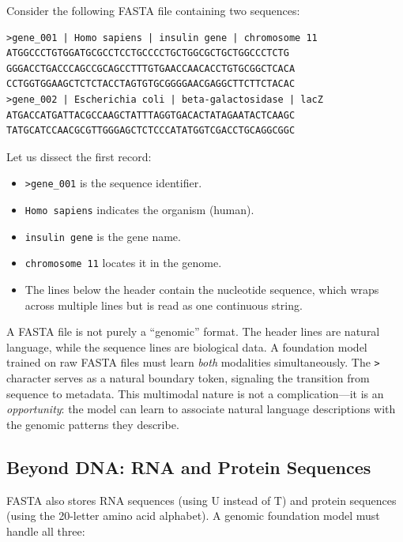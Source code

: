 \begin{example}
Consider the following FASTA file containing two sequences:

\begin{verbatim}
>gene_001 | Homo sapiens | insulin gene | chromosome 11
ATGGCCCTGTGGATGCGCCTCCTGCCCCTGCTGGCGCTGCTGGCCCTCTG
GGGACCTGACCCAGCCGCAGCCTTTGTGAACCAACACCTGTGCGGCTCACA
CCTGGTGGAAGCTCTCTACCTAGTGTGCGGGGAACGAGGCTTCTTCTACAC
>gene_002 | Escherichia coli | beta-galactosidase | lacZ
ATGACCATGATTACGCCAAGCTATTTAGGTGACACTATAGAATACTCAAGC
TATGCATCCAACGCGTTGGGAGCTCTCCCATATGGTCGACCTGCAGGCGGC
\end{verbatim}

\noindent
Let us dissect the first record:
\begin{itemize}[leftmargin=1.5em]
  \item \texttt{>gene\_001} is the sequence identifier.
  \item \texttt{Homo sapiens} indicates the organism (human).
  \item \texttt{insulin gene} is the gene name.
  \item \texttt{chromosome 11} locates it in the genome.
  \item The lines below the header contain the nucleotide sequence, which wraps across multiple lines but is read as one continuous string.
\end{itemize}
\end{example}

\begin{keyinsight}
A FASTA file is not purely a ``genomic'' format. The header lines are natural language, while the sequence lines are biological data. A foundation model trained on raw FASTA files must learn \emph{both} modalities simultaneously. The \texttt{>} character serves as a natural boundary token, signaling the transition from sequence to metadata. This multimodal nature is not a complication---it is an \emph{opportunity}: the model can learn to associate natural language descriptions with the genomic patterns they describe.
\end{keyinsight}

\subsection{Beyond DNA: RNA and Protein Sequences}

FASTA also stores RNA sequences (using U instead of T) and protein sequences (using the 20-letter amino acid alphabet). A genomic foundation model must handle all three:


